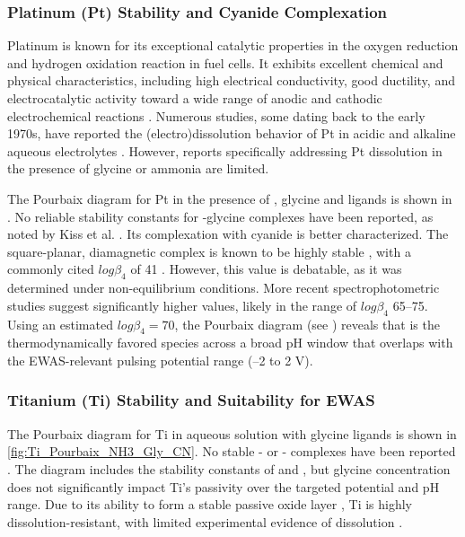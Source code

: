 \documentclass[journal=jacsat,manuscript=article]{achemso}
\begin{document}
\subsubsection{Platinum (Pt) Stability and Cyanide Complexation}

Platinum is known for its exceptional catalytic properties \cite{Debe2012ElectrocatalystCells, Daubinger2014ElectrochemicalStudy} in the oxygen reduction and hydrogen oxidation reaction in fuel cells. It exhibits excellent chemical and physical characteristics, including high electrical conductivity, good ductility, and electrocatalytic activity toward a wide range of anodic and cathodic electrochemical reactions \cite{Jerkiewicz2022ApplicabilityResearch}. Numerous studies, some dating back to the early 1970s, have reported the (electro)dissolution behavior of Pt in acidic and alkaline aqueous electrolytes \cite{Rand1972AVoltammetry, Tian2016InfluenceConditions, Xing2014PlatinumCycling}. However, reports specifically addressing Pt dissolution in the presence of glycine or ammonia are limited.

The Pourbaix diagram for Pt in the presence of , glycine and  ligands is shown in . No reliable stability constants for -glycine complexes have been reported, as noted by Kiss et al. \cite{Kiss1991CriticalGlycine}. Its complexation with cyanide is better characterized. The square-planar, diamagnetic  complex is known to be highly stable \cite{Griffith1962CyanideMetals}, with a commonly cited $log\beta_4$ of 41 \cite{Smith1989CriticalConstants}. However, this value is debatable, as it was determined under non-equilibrium conditions. More recent spectrophotometric studies \cite{Hancock1976FormationTetrakiscyanopalladate2-} suggest significantly higher values, likely in the range of $log\beta_4$ 65–75. Using an estimated $log\beta_4 = 70$, the Pourbaix diagram (see ) reveals that  is the thermodynamically favored species across a broad pH window that overlaps with the EWAS-relevant pulsing potential range (–2 to 2 V). 

\subsubsection{Titanium (Ti) Stability and Suitability for EWAS}

The Pourbaix diagram for Ti in aqueous solution with glycine ligands is shown in \ref{fig:Ti_Pourbaix_NH3_Gly_CN}. No stable - or - complexes have been reported \cite{Griffith1962CyanideMetals, Nicholls1980ComplexTitanium}. The diagram includes the stability constants of \ce{[Ti(Gly)^-]} and \ce{[Ti(Gly)_2^+]}, but glycine concentration does not significantly impact Ti's passivity over the targeted potential and pH range. Due to its ability to form a stable passive oxide layer \cite{Kiss1991CriticalGlycine, PourbaixAtlasSolutions}, Ti is highly dissolution-resistant, with limited experimental evidence of dissolution \cite{Schmidt2009AqueousVoltammetry, Ziemniak1993SolubilityTemperatures, Knauss2001TiIV300C, Schmidt2006DissolutionEffect, Pocsi1988ComplexAcid}.
\end{document}
